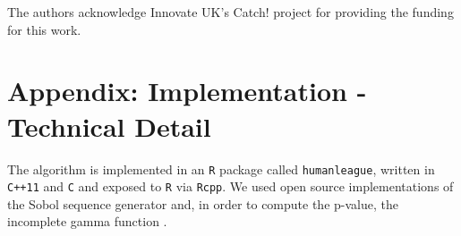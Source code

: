 \documentclass{JASSS}
\begin{document}
The authors acknowledge Innovate UK's Catch! project for providing the
funding for this work.







\endparano




\section{Appendix: Implementation - Technical Detail} 
The algorithm is implemented in an \texttt{R} package called
\texttt{humanleague}, written in \texttt{C++11} and \texttt{C} and
exposed to \texttt{R} via \texttt{Rcpp}. We used open source
implementations of the Sobol sequence generator \citep{johnson_stevengj/nlopt:_nodate} and, in order to 
compute the p-value, the
incomplete gamma function \citep{burkardt_asa032_2008}.
\end{document}

